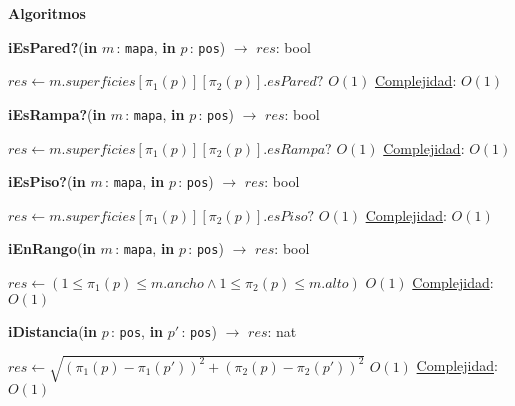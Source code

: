 \documentclass[a4paper,10pt]{article}
\let\TipoVariable=\texttt
\let\ModificadorArgumento=\textbf
\newcommand{\In}[2]{\ModificadorArgumento{in} \ensuremath{#1}\,: \TipoVariable{#2}\xspace}
\newenvironment{Algoritmos}{%
  \vspace*{2ex}%
  \noindent\textbf{\Large Algoritmos}%
  \vspace*{2ex}%
}{}
\begin{document}
\begin{Algoritmos}
\begin{algorithm}[H]{\textbf{iEsPared?}(\In{m}{mapa}, \In{p}{pos}) $\to$ $res$: bool}
      \begin{algorithmic}[1]
       \State $res \gets m.superficies[\pi_{1}(p)][\pi_{2}(p)].esPared?$   \Comment $O(1)$
      \medskip
      \Statex \underline{Complejidad}: $O(1)$
      \end{algorithmic}
\end{algorithm}  

\begin{algorithm}[H]{\textbf{iEsRampa?}(\In{m}{mapa}, \In{p}{pos}) $\to$ $res$: bool}
      \begin{algorithmic}[1]
       \State $res \gets m.superficies[\pi_{1}(p)][\pi_{2}(p)].esRampa?$   \Comment $O(1)$
      \medskip
      \Statex \underline{Complejidad}: $O(1)$
      \end{algorithmic}
\end{algorithm}  

\begin{algorithm}[H]{\textbf{iEsPiso?}(\In{m}{mapa}, \In{p}{pos}) $\to$ $res$: bool}
      \begin{algorithmic}[1]
       \State $res \gets m.superficies[\pi_{1}(p)][\pi_{2}(p)].esPiso?$   \Comment $O(1)$
      \medskip
      \Statex \underline{Complejidad}: $O(1)$
      \end{algorithmic}
\end{algorithm}  

\begin{algorithm}[H]{\textbf{iEnRango}(\In{m}{mapa}, \In{p}{pos}) $\to$ $res$: bool}
      \begin{algorithmic}[1]
       \State $res \gets (1 \leq \pi_{1}(p) \leq m.ancho \land 1 \leq \pi_{2}(p) \leq m.alto) $  \Comment $O(1)$
      \medskip
      \Statex \underline{Complejidad}: $O(1)$
      \end{algorithmic}
\end{algorithm}  

  
\begin{algorithm}[H]{\textbf{iDistancia}(\In{p}{pos}, \In{p'}{pos}) $\to$ $res$: nat}
      \begin{algorithmic}[1]
       \State $res \gets \sqrt{(\pi_{1}(p)-\pi_{1}(p'))^2+(\pi_{2}(p)-\pi_{2}(p'))^2} $         \Comment $O(1)$
      \medskip
      \Statex \underline{Complejidad}: $O(1)$
      \end{algorithmic}
\end{algorithm}   
  
\end{Algoritmos}
\end{document}
